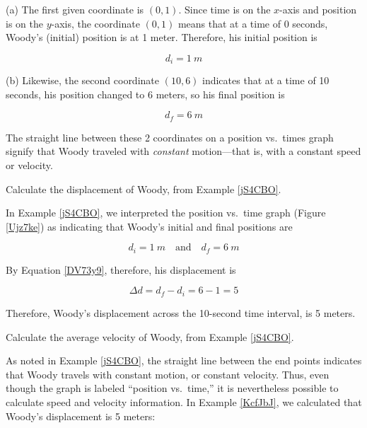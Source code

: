 \documentclass[main.tex]{subfiles}
\begin{document}
\Solution (a) The first given coordinate is $(0,1)$. Since time is on the $x$-axis and position is on the $y$-axis, the coordinate $(0,1)$ means that at a time of 0 seconds, Woody's (initial) position is at 1 meter. Therefore, his initial position is 

\begin{equation*}
    d_i = \SI{1}{m}
\end{equation*}

(b) Likewise, the second coordinate $(10,6)$ indicates that at a time of 10 seconds, his position changed to 6 meters, so his final position is

\begin{equation*}
    d_f = \SI{6}{m}
\end{equation*}

The straight line between these 2 coordinates on a position vs.~times graph  signify that Woody traveled with \textit{constant} motion---that is, with a constant speed or velocity.

\solutionEnd

\begin{example} \label{KcfJbJ}
    Calculate the displacement of Woody, from Example \ref{jS4CBO}. 
\end{example}

\Solution In Example \ref{jS4CBO}, we interpreted the position vs.~time graph (Figure \ref{Ujz7ke}) as indicating that Woody's initial and final positions are

\begin{equation*}
    d_i = \SI{1}{m} \quad \text{and} \quad d_f = \SI{6}{m}
\end{equation*}

By Equation \eqref{DV73y9}, therefore, his displacement is

\begin{equation*}
    \Delta d = d_f - d_i = 6 - 1 = 5
\end{equation*}

Therefore, Woody's displacement across the 10-second time interval, is 5 meters.

\solutionEnd

\begin{example}
    Calculate the average velocity of Woody, from Example \ref{jS4CBO}. 
\end{example}

\Solution As noted in Example \ref{jS4CBO}, the straight line between the end points indicates that Woody travels with constant motion, or constant velocity. Thus, even though the graph is labeled ``position vs.~time,'' it is nevertheless possible to calculate speed and velocity information. In Example \ref{KcfJbJ}, we calculated that Woody's displacement is 5 meters:
\end{document}
